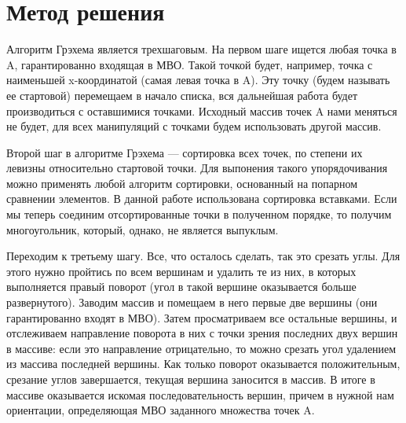 \documentclass{report}
\begin{document}
\section*{Метод решения}
Алгоритм Грэхема является трехшаговым. На первом шаге ищется любая точка в A, гарантированно входящая в МВО. Такой точкой будет, например, точка с наименьшей x-координатой (самая левая точка в A). Эту точку (будем называть ее стартовой) перемещаем в начало списка, вся дальнейшая работа будет производиться с оставшимися точками. Исходный массив точек A нами меняться не будет, для всех манипуляций с точками будем использовать другой массив.
\par Второй шаг в алгоритме Грэхема — сортировка всех точек, по степени их левизны относительно стартовой точки. Для выпонения такого упорядочивания можно применять любой алгоритм сортировки, основанный на попарном сравнении элементов. В данной работе использована сортировка вставками. Если мы теперь соединим отсортированные точки в полученном порядке, то получим многоугольник, который, однако, не является выпуклым.
\par Переходим к третьему шагу. Все, что осталось сделать, так это срезать углы. Для этого нужно пройтись по всем вершинам и удалить те из них, в которых выполняется правый поворот (угол в такой вершине оказывается больше развернутого). Заводим массив и помещаем в него первые две вершины (они гарантированно входят в МВО). Затем просматриваем все остальные вершины, и отслеживаем направление поворота в них с точки зрения последних двух вершин в массиве: если это направление отрицательно, то можно срезать угол удалением из массива последней вершины. Как только поворот оказывается положительным, срезание углов завершается, текущая вершина заносится в массив. В итоге в массиве оказывается искомая последовательность вершин, причем в нужной нам ориентации, определяющая МВО заданного множества точек A.
\newpage

\end{document}
